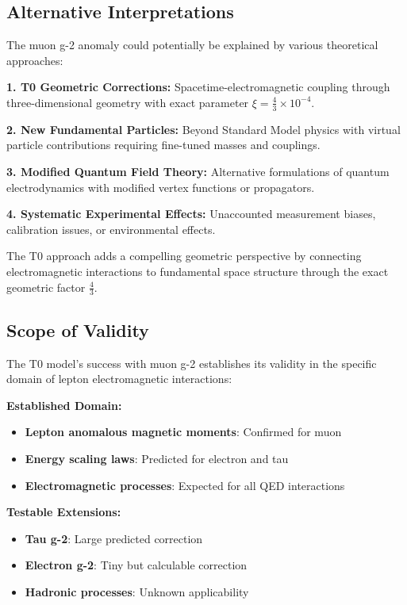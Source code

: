 \documentclass[12pt,a4paper]{report}
\begin{document}
\subsection{Alternative Interpretations}
\label{subsec:alternative_interpretations}

The muon g-2 anomaly could potentially be explained by various theoretical approaches:

\textbf{1. T0 Geometric Corrections:}
Spacetime-electromagnetic coupling through three-dimensional geometry with exact parameter $\xi = \frac{4}{3} \times 10^{-4}$.

\textbf{2. New Fundamental Particles:}
Beyond Standard Model physics with virtual particle contributions requiring fine-tuned masses and couplings.

\textbf{3. Modified Quantum Field Theory:}
Alternative formulations of quantum electrodynamics with modified vertex functions or propagators.

\textbf{4. Systematic Experimental Effects:}
Unaccounted measurement biases, calibration issues, or environmental effects.

The T0 approach adds a compelling geometric perspective by connecting electromagnetic interactions to fundamental space structure through the exact geometric factor $\frac{4}{3}$.

\subsection{Scope of Validity}
\label{subsec:scope_validity}

The T0 model's success with muon g-2 establishes its validity in the specific domain of lepton electromagnetic interactions:

\textbf{Established Domain:}
\begin{itemize}
	\item \textbf{Lepton anomalous magnetic moments}: Confirmed for muon
	\item \textbf{Energy scaling laws}: Predicted for electron and tau
	\item \textbf{Electromagnetic processes}: Expected for all QED interactions
\end{itemize}

\textbf{Testable Extensions:}
\begin{itemize}
	\item \textbf{Tau g-2}: Large predicted correction
	\item \textbf{Electron g-2}: Tiny but calculable correction
	\item \textbf{Hadronic processes}: Unknown applicability
\end{itemize}
\end{document}
